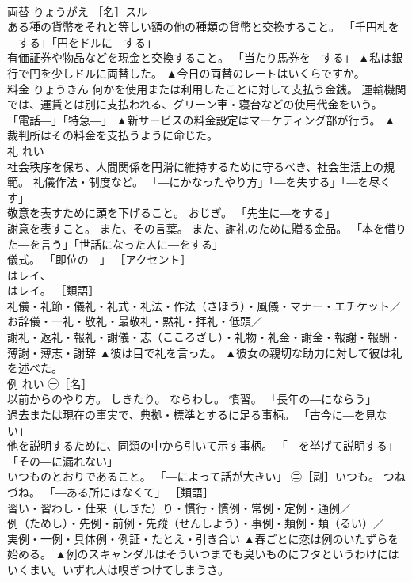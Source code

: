 \documentclass[8pt]{extreport}
\begin{document}
\begin{CJK}{UTF8}{min}
\\	両替	りょうがえ	［名］スル 
\\	ある種の貨幣をそれと等しい額の他の種類の貨幣と交換すること。 「千円札を―する」「円をドルに―する」 
\\	有価証券や物品などを現金と交換すること。 「当たり馬券を―する」	▲私は銀行で円を少しドルに両替した。 ▲今日の両替のレートはいくらですか。
\\	料金	りょうきん	何かを使用または利用したことに対して支払う金銭。 運輸機関では、運賃とは別に支払われる、グリーン車・寝台などの使用代金をいう。 「電話―」「特急―」	▲新サービスの料金設定はマーケティング部が行う。 ▲裁判所はその料金を支払うように命じた。
\\	礼	れい	
\\	社会秩序を保ち、人間関係を円滑に維持するために守るべき、社会生活上の規範。 礼儀作法・制度など。 「―にかなったやり方」「―を失する」「―を尽くす」 
\\	敬意を表すために頭を下げること。 おじぎ。 「先生に―をする」 
\\	謝意を表すこと。 また、その言葉。 また、謝礼のために贈る金品。 「本を借りた―を言う」「世話になった人に―をする」 
\\	儀式。 「即位の―」 ［アクセント］ 
\\	はレイ、 
\\	はレイ。 ［類語］
\\	礼儀・礼節・儀礼・礼式・礼法・作法（さほう）・風儀・マナー・エチケット／
\\	お辞儀・一礼・敬礼・最敬礼・黙礼・拝礼・低頭／
\\	謝礼・返礼・報礼・謝儀・志（こころざし）・礼物・礼金・謝金・報謝・報酬・薄謝・薄志・謝辞	▲彼は目で礼を言った。 ▲彼女の親切な助力に対して彼は礼を述べた。
\\	例	れい	㊀［名］ 
\\	以前からのやり方。 しきたり。 ならわし。 慣習。 「長年の―にならう」 
\\	過去または現在の事実で、典拠・標準とするに足る事柄。 「古今に―を見ない」 
\\	他を説明するために、同類の中から引いて示す事柄。 「―を挙げて説明する」「その―に漏れない」 
\\	いつものとおりであること。 「―によって話が大きい」 ㊁［副］いつも。 つねづね。 「―ある所にはなくて」 ［類語］
\\	習い・習わし・仕来（しきた）り・慣行・慣例・常例・定例・通例／
\\	例（ためし）・先例・前例・先蹤（せんしよう）・事例・類例・類（るい）／
\\	実例・一例・具体例・例証・たとえ・引き合い	▲春ごとに恋は例のいたずらを始める。 ▲例のスキャンダルはそういつまでも臭いものにフタというわけにはいくまい。いずれ人は嗅ぎつけてしまうさ。

\end{CJK}
\end{document}
